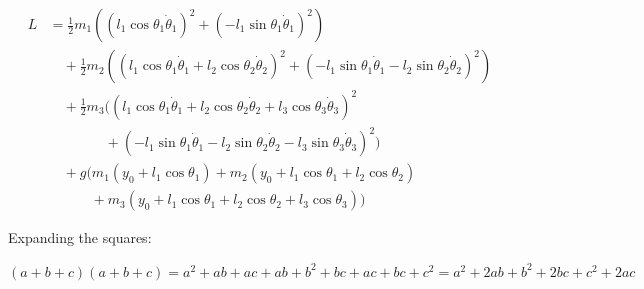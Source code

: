 \documentclass[11pt,a4paper]{article}
\begin{document}
\begin{align*}
L &= \frac{1}{2} m_1 \left( (l_1 \cos\theta_1 \dot{\theta}_1)^2 + (-l_1 \sin\theta_1 \dot{\theta}_1)^2 \right) \\
    &\quad + \frac{1}{2} m_2 \left( (l_1 \cos\theta_1 \dot{\theta}_1 + l_2 \cos\theta_2 \dot{\theta}_2)^2 + (-l_1 \sin\theta_1 \dot{\theta}_1 - l_2 \sin\theta_2 \dot{\theta}_2)^2 \right) \\
    &\quad + \frac{1}{2} m_3 \big( (l_1 \cos\theta_1 \dot{\theta}_1 + l_2 \cos\theta_2 \dot{\theta}_2 + l_3 \cos\theta_3 \dot{\theta}_3)^2 \\
    &\quad\quad\quad\quad + (-l_1 \sin\theta_1 \dot{\theta}_1 - l_2 \sin\theta_2 \dot{\theta}_2 - l_3 \sin\theta_3 \dot{\theta}_3)^2 \big) \\
    &\quad + g \big( m_1 (y_0 + l_1 \cos\theta_1) + m_2 (y_0 + l_1 \cos\theta_1 + l_2 \cos\theta_2) \\
    &\quad\quad\quad + m_3 (y_0 + l_1 \cos\theta_1 + l_2 \cos\theta_2 + l_3 \cos\theta_3) \big)
\end{align*}

Expanding the squares:

$(a+b+c)(a+b+c) = a^2 + a b + a c + a b + b^2 + b c + a c + b c + c^2 = a^2 + 2 a b + b^2 + 2 b c + c^2 + 2 a c$
\end{document}
